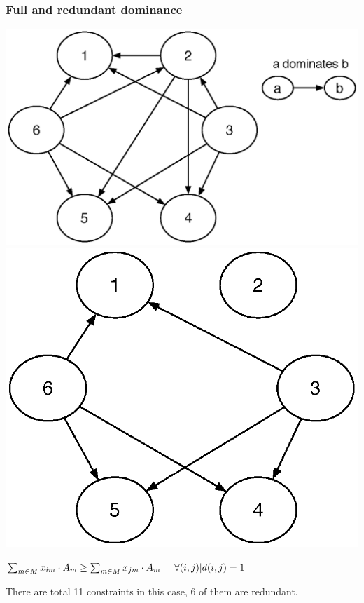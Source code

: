 \documentclass[aspectratio=169]{beamer}
\begin{document}
\begin{frame}
\frametitle{Full and redundant dominance }

 \includegraphics[scale=0.5]{pic/dominance1.eps}
\includegraphics[scale = 0.5]{pic/dominance2.eps}

$ \sum_{m \in M} x_{im}\cdot A_m \geq \sum_{m \in M} 
x_{jm}\cdot A_m \hspace{0.5cm}  \forall
(i,j)|d(i,j)=1 $

There are total 11 constraints in this case, 6 of them are redundant.

\end{frame}
\end{document}

